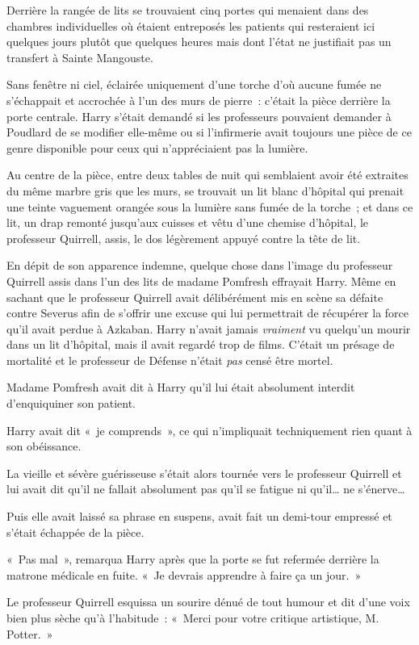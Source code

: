 Derrière la rangée de lits se trouvaient cinq portes qui menaient dans des chambres individuelles où étaient entreposés les patients qui resteraient ici quelques jours plutôt que quelques heures mais dont l'état ne justifiait pas un transfert à Sainte Mangouste.

Sans fenêtre ni ciel, éclairée uniquement d'une torche d'où aucune fumée ne s'échappait et accrochée à l'un des murs de pierre~: c'était la pièce derrière la porte centrale. Harry s'était demandé si les professeurs pouvaient demander à Poudlard de se modifier elle-même ou si l'infirmerie avait toujours une pièce de ce genre disponible pour ceux qui n'appréciaient pas la lumière.

Au centre de la pièce, entre deux tables de nuit qui semblaient avoir été extraites du même marbre gris que les murs, se trouvait un lit blanc d'hôpital qui prenait une teinte vaguement orangée sous la lumière sans fumée de la torche~; et dans ce lit, un drap remonté jusqu'aux cuisses et vêtu d'une chemise d'hôpital, le professeur Quirrell, assis, le dos légèrement appuyé contre la tête de lit.

En dépit de son apparence indemne, quelque chose dans l'image du professeur Quirrell assis dans l'un des lits de madame Pomfresh effrayait Harry. Même en sachant que le professeur Quirrell avait délibérément mis en scène sa défaite contre Severus afin de s'offrir une excuse qui lui permettrait de récupérer la force qu'il avait perdue à Azkaban. Harry n'avait jamais \emph{vraiment} vu quelqu'un mourir dans un lit d'hôpital, mais il avait regardé trop de films. C'était un présage de mortalité et le professeur de Défense n'était \emph{pas} censé être mortel.

Madame Pomfresh avait dit à Harry qu'il lui était absolument interdit d'enquiquiner son patient.

Harry avait dit «~je comprends~», ce qui n'impliquait techniquement rien quant à son obéissance.

La vieille et sévère guérisseuse s'était alors tournée vers le professeur Quirrell et lui avait dit qu'il ne fallait absolument pas qu'il se fatigue ni qu'il… ne s'énerve…

Puis elle avait laissé sa phrase en suspens, avait fait un demi-tour empressé et s'était échappée de la pièce.

«~Pas mal~», remarqua Harry après que la porte se fut refermée derrière la matrone médicale en fuite. «~Je devrais apprendre à faire ça un jour.~»

Le professeur Quirrell esquissa un sourire dénué de tout humour et dit d'une voix bien plus sèche qu'à l'habitude~: «~Merci pour votre critique artistique, M. Potter.~»

